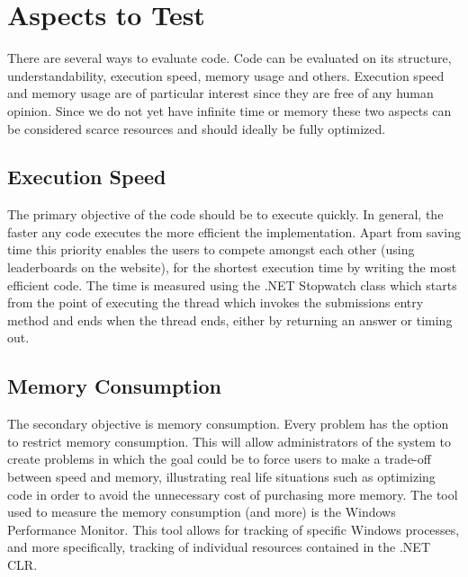 \section{Aspects to Test}
There are several ways to evaluate code. Code can be evaluated on its structure, understandability, execution speed, memory usage and others. Execution speed and memory usage are of particular interest since they are free of any human opinion. Since we do not yet have infinite time or memory these two aspects can be considered scarce resources and should ideally be fully optimized.


\subsection{Execution Speed}
The primary objective of the code should be to execute quickly. In general, the faster any code executes the more efficient the implementation. Apart from saving time this priority enables the users to compete amongst each other (using leaderboards on the website), for the shortest execution time by writing the most efficient code. 
The time is measured using the .NET Stopwatch class \cite{Stopwatch} which starts from the point of executing the thread which invokes the submissions entry method and ends when the thread ends, either by returning an answer or timing out. 


\subsection{Memory Consumption}
The secondary objective is memory consumption. Every problem has the option to restrict memory consumption. This will allow administrators of the system to create problems in which the goal could be to force users to make a trade-off between speed and memory, illustrating real life situations such as optimizing code in order to avoid the unnecessary cost of purchasing more memory.
The tool used to measure the memory consumption (and more) is the Windows Performance Monitor. This tool allows for tracking of specific Windows processes, and more specifically, tracking of individual resources contained in the .NET CLR.
